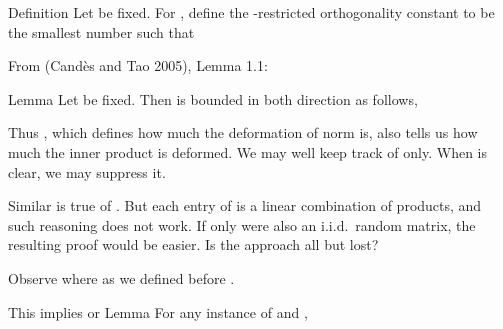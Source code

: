 \stopsubsection

\startsubsection [title={Expectation of Products of Matrix Entry}]

\Result
{Definition}
{
Let  be fixed.
For , define the -restricted orthogonality constant  to be the smallest number such that
}

From  (Cand\`es and Tao 2005), Lemma 1.1:

\Result
{Lemma}
{
Let  be fixed.
Then  is bounded in both direction as follows,
}

Thus , which defines how much the deformation of norm is, also tells us how much the inner product is deformed.
We may well keep track of  only.
When  is clear, we may suppress it.

Similar is true of .
But each entry of  is a linear combination of products, and such reasoning does not work.
If only  were also an i.i.d.\ random matrix, the resulting proof would be easier.
Is the approach all but lost?


Observe
where as we defined before .

This implies
or
\Result
{Lemma}
{
For any instance of  and ,
}

